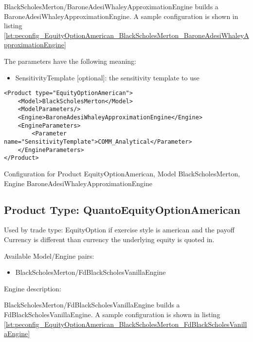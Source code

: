 BlackScholesMerton/BaroneAdesiWhaleyApproximationEngine builds a BaroneAdesiWhaleyApproximationEngine. A sample configuration is shown in listing
\ref{lst:peconfig_EquityOptionAmerican_BlackScholesMerton_BaroneAdesiWhaleyApproximationEngine}

The parameters have the following meaning:

\begin{itemize}
\item SensitivityTemplate [optional]: the sensitivity template to use 
\end{itemize}

\begin{longlisting}
\begin{verbatim}
<Product type="EquityOptionAmerican">
    <Model>BlackScholesMerton</Model>
    <ModelParameters/>
    <Engine>BaroneAdesiWhaleyApproximationEngine</Engine>
    <EngineParameters>
        <Parameter name="SensitivityTemplate">COMM_Analytical</Parameter>
    </EngineParameters>
</Product>
\end{verbatim}
\caption{Configuration for Product EquityOptionAmerican, Model BlackScholesMerton, Engine BaroneAdesiWhaleyApproximationEngine}
\label{lst:peconfig_EquityOptionAmerican_BlackScholesMerton_BaroneAdesiWhaleyApproximationEngine}
\end{longlisting}

\subsection{Product Type: QuantoEquityOptionAmerican}

Used by trade type: EquityOption if exercise style is american and the payoff Currency is different than currency the underlying equity is quoted in.

Available Model/Engine pairs:

\begin{itemize}
\item BlackScholesMerton/FdBlackScholesVanillaEngine
\end{itemize}

Engine description:

BlackScholesMerton/FdBlackScholesVanillaEngine builds a FdBlackScholesVanillaEngine. A sample configuration is shown in listing
\ref{lst:peconfig_EquityOptionAmerican_BlackScholesMerton_FdBlackScholesVanillaEngine}

